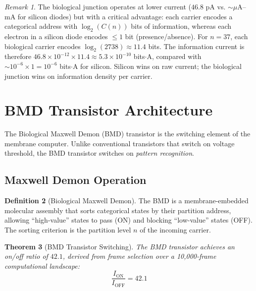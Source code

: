 \documentclass[12pt]{article}
\newtheorem{theorem}{Theorem}[section]
\theoremstyle{definition}
\newtheorem{definition}[theorem]{Definition}
\theoremstyle{remark}
\newtheorem{remark}[theorem]{Remark}
\begin{document}
\begin{remark}
The biological junction operates at lower current ($46.8$ pA vs. $\sim \mu$A--mA for silicon diodes) but with a critical advantage: each carrier encodes a categorical address with $\log_2(C(n))$ bits of information, whereas each electron in a silicon diode encodes $\leq 1$ bit (presence/absence). For $n = 37$, each biological carrier encodes $\log_2(2738) \approx 11.4$ bits. The information current is therefore $46.8 \times 10^{-12} \times 11.4 \approx 5.3 \times 10^{-10}$ bits$\cdot$A, compared with $\sim 10^{-6} \times 1 = 10^{-6}$ bits$\cdot$A for silicon. Silicon wins on raw current; the biological junction wins on information density per carrier.
\end{remark}


\section{BMD Transistor Architecture}
\label{sec:bmd}

The Biological Maxwell Demon (BMD) transistor is the switching element of the membrane computer. Unlike conventional transistors that switch on voltage threshold, the BMD transistor switches on \emph{pattern recognition}.

\subsection{Maxwell Demon Operation}

\begin{definition}[Biological Maxwell Demon]
\label{def:bmd}
The BMD is a membrane-embedded molecular assembly that sorts categorical states by their partition address, allowing ``high-value'' states to pass (ON) and blocking ``low-value'' states (OFF). The sorting criterion is the partition level $n$ of the incoming carrier.
\end{definition}

\begin{theorem}[BMD Transistor Switching]
\label{thm:bmd}
The BMD transistor achieves an on/off ratio of $42.1$, derived from frame selection over a 10,000-frame computational landscape:
\begin{equation}
\label{eq:onoff}
\frac{I_{\mathrm{ON}}}{I_{\mathrm{OFF}}} = 42.1
\end{equation}
\end{theorem}
\end{document}

